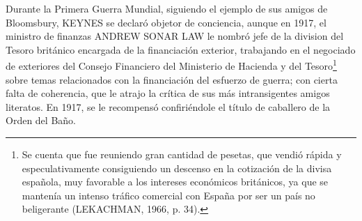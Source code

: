 \documentclass[10pt,a4paper]{article}
\begin{document}
Durante la Primera Guerra Mundial, siguiendo el ejemplo de sus amigos de Bloomsbury, KEYNES se declaró objetor de conciencia, aunque en 1917, el ministro de finanzas ANDREW SONAR LAW le nombró jefe de la division del Tesoro británico encargada de la financiación exterior, trabajando en el negociado de exteriores del Consejo Financiero del Ministerio de Hacienda y del Tesoro\footnote{%
    Se cuenta que fue reuniendo gran cantidad de pesetas, que vendió rápida y especulativamente consiguiendo un descenso en la cotización de la divisa española, muy favorable a los intereses económicos británicos, ya que se mantenía un intenso tráfico comercial con España por ser un país no beligerante (LEKACHMAN, 1966, p. 34).
} sobre temas relacionados con la financiación del esfuerzo de guerra; con cierta falta de coherencia, que le atrajo la crítica de sus más intransigentes amigos literatos. En 1917, se le recompensó confiriéndole el título de caballero de la Orden del Baño.
\end{document}
